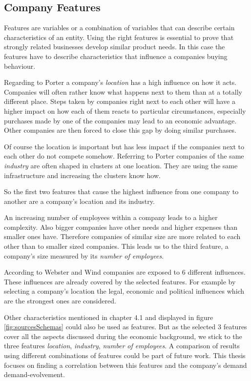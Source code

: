 \subsection{Company Features}
\label{companyFeatures}
Features are variables or a combination of variables that can describe certain characteristics of an entity. Using the right
features is essential to prove that strongly related businesses develop similar product needs. In this case the features have
to describe characteristics that influence a companies buying behaviour.

Regarding to Porter \cite{CompanyClusters} a company's \emph{location} has a high influence on how it acts. Companies will often rather know what happens next to
them than at a totally different place. Steps taken by companies right next to each other will have a higher impact on
how each of them reacts to particular circumstances, especially purchases made by one of the companies may lead to an economic
advantage. Other companies are then forced to close this gap by doing similar purchases.

Of course the location is important but has less impact if the companies next to each other do not compete somehow.
Referring to Porter \cite{CompanyClusters} companies of the same \emph{industry} are often shaped in clusters at one location.
They are using the same infrastructure and increasing the clusters know how.

So the first two features that cause the highest influence from one company to another are a company's location and its industry.

An increasing number of employees within a company leads to a higher complexity. Also bigger companies have other needs and higher expenses than
smaller ones have. Therefore companies of similar size are more related to each other than to smaller sized companies.
This leads us to the third feature, a company's size measured by its \emph{number of employees}.

According to Webster and Wind \cite{BusinessBuyingBehavior} companies are exposed to 6 different influences. These influences are already covered
by the selected features. For example by selecting a company's location the legal, economic and political influences which
are the strongest ones are considered.

Other characteristics mentioned in chapter 4.1 and displayed in figure \ref{fig:sourcesSchemas} could also be used as features. But as the selected 3 features cover all the aspects
discussed during the economic background, we stick to the three features \emph{location}, \emph{industry}, \emph{number of employees}. A comparison of results using different combinations of
features could be part of future work. This thesis focuses on finding a correlation between this features and the company's demand
demand-evolvement.


